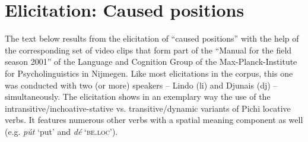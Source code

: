 \section{Elicitation: Caused positions}

The text below results from the elicitation of “caused positions” with the help of the corresponding set of video clips that form part of the “Manual for the field season 2001” of the Language and Cognition Group of the Max-Planck-Institute for Psycholinguistics in Nijmegen. Like most elicitations in the corpus, this one was conducted with two (or more) speakers – Lindo (li) and Djunais (dj) – simultaneously. The elicitation shows in an exemplary way the use of the intransitive/inchoative-stative vs. transitive/dynamic variants of Pichi locative verbs. It features numerous other verbs with a spatial meaning component as well (e.g. \textit{pút} ‘put’ and \textit{dé} \textsc{‘be.loc’}).

\newpage 
\setcounter{equation}{0}  %

